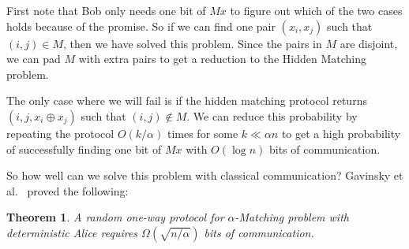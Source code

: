 \documentclass[a4paper]{article}
\newtheorem{theorem}{Theorem}[section]
\begin{document}
        First note that Bob only needs one bit of $Mx$ to figure out which of the two cases holds because of the promise. So if we can find one pair $(x_i, x_j)$ such that $(i, j) \in M$, then we have solved this problem. Since the pairs in $M$ are disjoint, we can pad $M$ with extra pairs to get a reduction to the Hidden Matching problem.

        The only case where we will fail is if the hidden matching protocol returns $(i, j, x_i \oplus x_j)$ such that $(i, j) \notin M$. We can reduce this probability by repeating the protocol $O(k/\alpha)$ times for some $k \ll \alpha n$ to get a high probability of successfully finding one bit of $Mx$ with $O(\log n)$ bits of communication.

        So how well can we solve this problem with classical communication? Gavinsky et al.~\cite{Gavinsky:2007:ESO:1250790.1250866} proved the following:

        \begin{theorem}
            A random one-way protocol for $\alpha$-Matching problem with deterministic Alice requires $\Omega(\sqrt{n/\alpha})$ bits of communication.
        \end{theorem}
\end{document}
